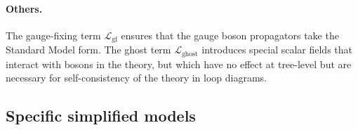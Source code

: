 \paragraph{Others.}
The gauge-fixing term $\mathcal{L}_\mathrm{gf}$ ensures that the gauge boson
propagators take the Standard Model form.
The ghost term $\mathcal{L}_\mathrm{ghost}$ introduces special scalar fields
that interact with bosons in the theory, but which have no effect at tree-level
but are necessary for self-consistency of the theory in loop diagrams.


\subsection{Specific simplified models}


